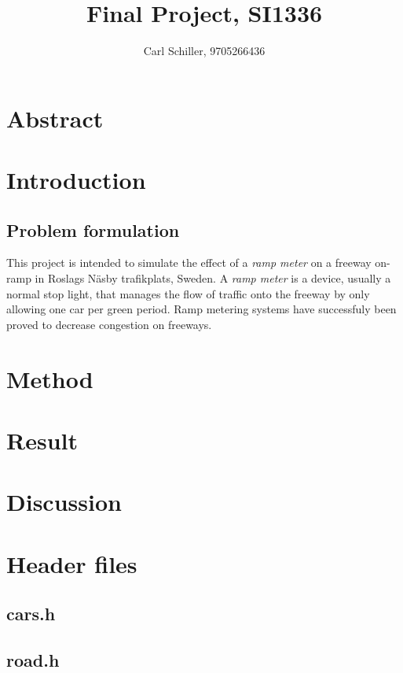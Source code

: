 \documentclass{article}
\author{Carl Schiller, 9705266436}
\title{Final Project, SI1336}
\begin{document}
\maketitle

\section*{Abstract}

\tableofcontents

\newpage

\section{Introduction}
\subsection{Problem formulation}
This project is intended to simulate the effect of a \textit{ramp meter} on a freeway
on-ramp in Roslags Näsby trafikplats, Sweden. A \textit{ramp meter} is a device, usually a
normal stop light, that
manages the flow of traffic onto the freeway by only allowing one car per green period.
Ramp metering systems have successfuly been proved to decrease congestion on freeways. ~\cite{noauthor_ramp_2018}
\section{Method}

\section{Result}

\section{Discussion}

\printbibliography
\pagebreak
\appendix

\section{Header files}
  \subsection{cars.h}
    
  \subsection{road.h}
    
\end{document}
